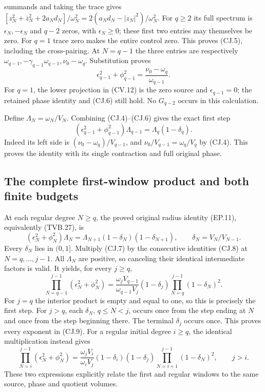 summands and taking the trace gives
$[z_N^2+\overline z_N^2+2a_Nd_N]/\omega_N^2
=2(a_Nd_N-|z_N|^2)/\omega_N^2$.
For $q\ge2$ its full spectrum is $\epsilon_N,-\epsilon_N$
and $q-2$ zeros, with $\epsilon_N\ge0$; these first two
entries may themselves be zero. For $q=1$ trace zero makes
the entire control zero. This proves (CJ.5), including the cross-pairing.
At $N=q-1$ the three entries are respectively
$\omega_{q-1},-\gamma_{q-1}\omega_{q-1},\nu_0-\omega_q$.
Substitution proves
\[
 \epsilon_{q-1}^2+\phi_{q-1}^2
 =\frac{\nu_0-\omega_q}{\omega_{q-1}}.
 \tag{CJ.6}
\]
For $q=1$, the lower projection in (CV.12) is the zero source
and $\epsilon_{q-1}=0$; the retained phase identity and (CJ.6)
still hold. No $G_{q-2}$ occurs in this calculation.

Define $\Lambda_N=\omega_N/V_N$. Combining (CJ.4)--(CJ.6)
gives the exact first step
\[
 (\epsilon_{q-1}^2+\phi_{q-1}^2)\Lambda_{q-1}
      =\Lambda_q(1-\delta_q).
 \tag{CJ.7}
\]
Indeed its left side is $(\nu_0-\omega_q)/V_{q-1}$, and
$\nu_0/V_{q-1}=\omega_q/V_q$ by (CJ.4). This proves the
identity with its single contraction and full original phase.

\subsection{The complete first-window product and both finite budgets}

At each regular degree $N\ge q$, the proved original radius
identity (EP.11), equivalently (TVB.27), is
\[
 (\epsilon_N^2+\phi_N^2)\Lambda_N
 =\Lambda_{N+1}(1-\delta_N)(1-\delta_{N+1}),
 \qquad \delta_N=V_N/V_{N-1}.
 \tag{CJ.8}
\]
Every $\delta_N$ lies in $(0,1]$. Multiply (CJ.7) by the
consecutive identities (CJ.8) at $N=q,\ldots,j-1$.
All $\Lambda_N$ are positive, so canceling their identical
intermediate factors is valid. It yields, for every $j\ge q$,
\[
 \boxed{
 \prod_{N=q-1}^{j-1}(\epsilon_N^2+\phi_N^2)
 =\frac{\omega_jV_{q-1}}{\omega_{q-1}V_j}
       (1-\delta_j)\prod_{N=q}^{j-1}(1-\delta_N)^2.}
 \tag{CJ.9}
\]
For $j=q$ the interior product is empty and equal to one,
so this is precisely the first step. For $j>q$, each
$\delta_N$, $q\le N<j$, occurs once from the step ending at
$N$ and once from the step beginning there. The terminal
$\delta_j$ occurs once. This proves every exponent in (CJ.9).
For a regular initial degree $i\ge q$, the identical multiplication
instead gives
\[
 \prod_{N=i}^{j-1}(\epsilon_N^2+\phi_N^2)
 =\frac{\omega_jV_i}{\omega_iV_j}
       (1-\delta_i)(1-\delta_j)
       \prod_{N=i+1}^{j-1}(1-\delta_N)^2,
 \qquad j>i.
 \tag{CJ.10}
\]
These two expressions explicitly relate the first and regular
windows to the same source, phase and quotient volumes.

